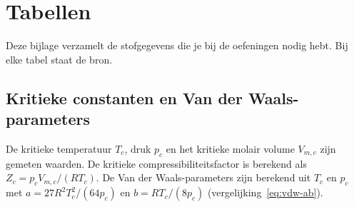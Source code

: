 \chapter{Tabellen}
\label{ch:tabellen}

Deze bijlage verzamelt de stofgegevens die je bij de oefeningen nodig hebt. Bij elke tabel staat de bron.

\section{Kritieke constanten en Van der Waals-parameters}

De kritieke temperatuur $T_c$, druk $p_c$ en het kritieke molair volume $V_{m,c}$ zijn gemeten waarden. De kritieke compressibiliteitsfactor is berekend als $Z_c = p_cV_{m,c}/(RT_c)$. De Van der Waals-parameters zijn berekend uit $T_c$ en $p_c$ met $a = 27R^2T_c^2/(64p_c)$ en $b = RT_c/(8p_c)$ (vergelijking~\eqref{eq:vdw-ab}).

